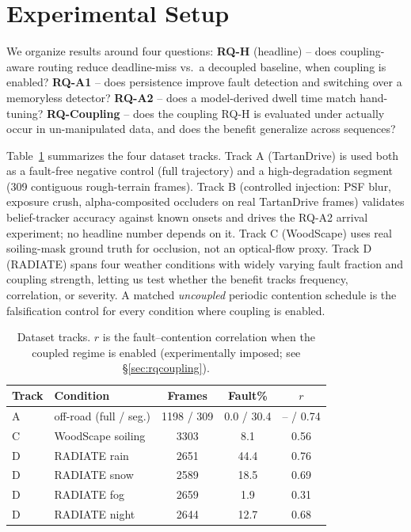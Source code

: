 \documentclass[conference]{IEEEtran}
\begin{document}
\section{Experimental Setup}
\label{sec:experiments}

We organize results around four questions: \textbf{RQ-H} (headline)
-- does coupling-aware routing reduce deadline-miss vs.\ a decoupled
baseline, when coupling is enabled? \textbf{RQ-A1} -- does
persistence improve fault detection and switching over a memoryless
detector? \textbf{RQ-A2} -- does a model-derived dwell time match
hand-tuning? \textbf{RQ-Coupling} -- does the coupling RQ-H is
evaluated under actually occur in un-manipulated data, and does the
benefit generalize across sequences?

Table~\ref{tab:tracks} summarizes the four dataset tracks. Track A
(TartanDrive) is used both as a fault-free negative control (full
trajectory) and a high-degradation segment (309 contiguous
rough-terrain frames). Track B (controlled injection: PSF blur,
exposure crush, alpha-composited occluders on real TartanDrive
frames) validates belief-tracker accuracy against known onsets and
drives the RQ-A2 arrival experiment; no headline number depends on
it. Track C (WoodScape) uses real soiling-mask ground truth for
occlusion, not an optical-flow proxy. Track D (RADIATE) spans four
weather conditions with widely varying fault fraction and coupling
strength, letting us test whether the benefit tracks frequency,
correlation, or severity. A matched \emph{uncoupled} periodic
contention schedule is the falsification control for every condition
where coupling is enabled.

\begin{table}[htbp]
\caption{Dataset tracks. $r$ is the fault--contention correlation
when the coupled regime is enabled (experimentally imposed; see
\S\ref{sec:rqcoupling}).}
\label{tab:tracks}
\centering
\footnotesize
\setlength{\tabcolsep}{3pt}
\begin{tabular}{llccc}
\toprule
\textbf{Track} & \textbf{Condition} & \textbf{Frames} & \textbf{Fault\%} & \textbf{$r$} \\
\midrule
A & off-road (full / seg.) & 1198 / 309 & 0.0 / 30.4 & -- / 0.74 \\
C & WoodScape soiling      & 3303       & 8.1        & 0.56 \\
D & RADIATE rain           & 2651       & 44.4       & 0.76 \\
D & RADIATE snow           & 2589       & 18.5       & 0.69 \\
D & RADIATE fog            & 2659       & 1.9        & 0.31 \\
D & RADIATE night          & 2644       & 12.7       & 0.68 \\
\bottomrule
\end{tabular}
\end{table}
\end{document}
